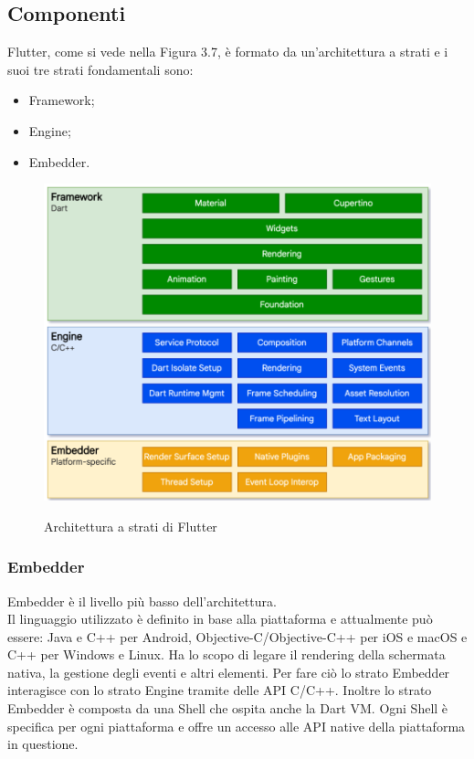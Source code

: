 \subsection{Componenti}
Flutter, come si vede nella Figura 3.7, è formato da un'architettura a strati \cite{flutterd, flutterdettagli} e i suoi tre strati fondamentali sono:
\begin{itemize}
	\item Framework; 
	\item Engine;  
	\item Embedder.\\
\end{itemize}
\begin{figure}[htbp]	
	\centering
	\includegraphics[width=13cm]{immagini/composizione.png}
	\caption{Architettura a strati di Flutter}
	\label{fig:Architettura a strati di Flutter}
	\cite{flutterdettagli}
\end{figure}

\newpage

\subsubsection{Embedder}
Embedder è il livello più basso dell'architettura.\\
Il linguaggio utilizzato è definito in base alla piattaforma e attualmente può essere: Java e C++ per Android, Objective-C/Objective-C++ per iOS e macOS e C++ per Windows e Linux.
Ha lo scopo di legare il rendering della schermata nativa, la gestione degli eventi e altri elementi.
Per fare ciò lo strato Embedder interagisce con lo strato Engine tramite delle API C/C++.
Inoltre lo strato Embedder è composta da una Shell che ospita anche la Dart VM.	
Ogni Shell è specifica per ogni piattaforma e offre un accesso alle API native della piattaforma in questione.

